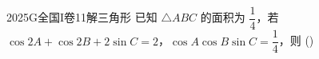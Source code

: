 
\begin{problem}{2025}{G}{全国I卷}{11}{解三角形}
已知 $\triangle ABC$ 的面积为 $\dfrac{1}{4}$，若 $\cos 2A + \cos 2B + 2\sin C = 2$，$\cos A \cos B \sin C = \dfrac{1}{4}$，则
(\hspace{1cm})
\begin{choices}
\end{choices}
\end{problem}